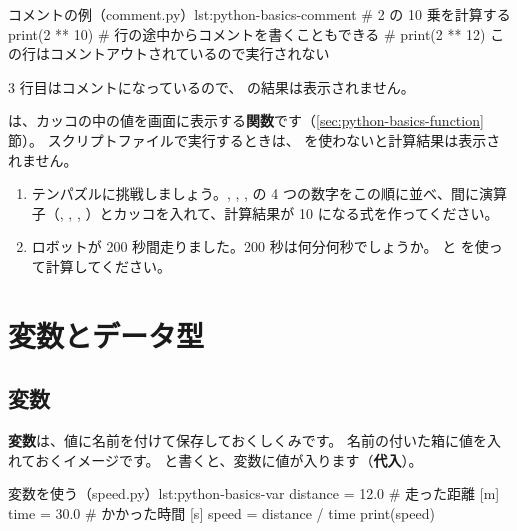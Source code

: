 \begin{codelisting}[style=python]{コメントの例（comment.py）}{lst:python-basics-comment}
# 2 の 10 乗を計算する
print(2 ** 10)   # 行の途中からコメントを書くこともできる
# print(2 ** 12) この行はコメントアウトされているので実行されない
\end{codelisting}


3 行目はコメントになっているので、 の結果は表示されません。

 は、カッコの中の値を画面に表示する\textbf{関数}です（\ref{sec:python-basics-function}節）。
スクリプトファイルで実行するときは、 を使わないと計算結果は表示されません。

\begin{exercise}
\begin{enumerate}
  \item テンパズルに挑戦しましょう。, , ,  の 4 つの数字をこの順に並べ、間に演算子（\cmd{+}, \cmd{-}, \cmd{*}, \cmd{/}）とカッコを入れて、計算結果が 10 になる式を作ってください。
  \item ロボットが 200 秒間走りました。200 秒は何分何秒でしょうか。\cmd{//} と \cmd{\%} を使って計算してください。
\end{enumerate}
\end{exercise}

\section{変数とデータ型}
\label{sec:python-basics-variable}

\subsection{変数}

\textbf{変数}は、値に名前を付けて保存しておくしくみです。
名前の付いた箱に値を入れておくイメージです。
 と書くと、変数に値が入ります（\textbf{代入}）。

\begin{codelisting}[style=python]{変数を使う（speed.py）}{lst:python-basics-var}
distance = 12.0   # 走った距離 [m]
time = 30.0       # かかった時間 [s]
speed = distance / time
print(speed)
\end{codelisting}

